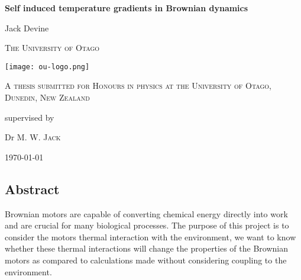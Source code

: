 \documentclass[11pt]{report} %
\begin{document}
	\begin{titlepage}
		\centering
		{\huge\bfseries Self induced temperature gradients in Brownian dynamics\par}
		\vspace{1cm}
		{\huge Jack Devine\par}
		\vspace{1cm}
		{\scshape\LARGE The University of Otago \par}
		\vspace{1cm}
		\texttt{[image: ou-logo.png]}\par\vspace{1cm}
		\vspace{1cm}
		{\scshape\Large A thesis submitted for Honours in physics at the University of Otago, Dunedin, New Zealand\par}
		\vspace{1.5cm}
		\vspace{2cm}
		\vfill
		supervised by\par
		Dr M. W. \textsc{Jack}

		\vfill

		{\large \today\par}
	\end{titlepage}


\newpage

%
\begin{center}
\section*{Abstract} %
\end{center}

Brownian motors are capable of converting chemical energy directly into work and are crucial for many biological processes. The purpose of this project is to consider the motors thermal interaction with  the environment, we want to know whether these thermal interactions will change the properties of the Brownian motors as compared to calculations made without considering coupling to the environment.
\end{document}
